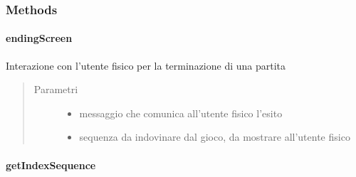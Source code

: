 \documentclass[letterpaper,10pt,italian,openany,oneside]{sphinxmanual}
\begin{document}
\subsubsection{Methods}
\label{\detokenize{source/it/unicam/cs/pa/mastermind/ui/GameView:methods}}

\paragraph{endingScreen}
\label{\detokenize{source/it/unicam/cs/pa/mastermind/ui/GameView:endingscreen}}

\begin{fulllineitems}
\label{\detokenize{source/it/unicam/cs/pa/mastermind/ui/GameView:it.unicam.cs.pa.mastermind.ui.GameView.endingScreen(String, List)}}
Interazione con l’utente fisico per la terminazione di una partita
\begin{quote}\begin{description}
\item[{Parametri}] \leavevmode\begin{itemize}
\item {} 
 \textendash{} messaggio che comunica all’utente fisico l’esito

\item {} 
 \textendash{} sequenza da indovinare dal gioco, da mostrare all’utente fisico

\end{itemize}

\end{description}\end{quote}

\end{fulllineitems}



\paragraph{getIndexSequence}
\label{\detokenize{source/it/unicam/cs/pa/mastermind/ui/GameView:getindexsequence}}
\end{document}
